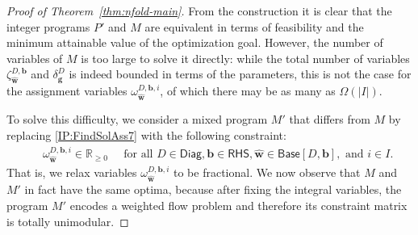 \documentclass{article}
\renewcommand{\geq}{\geqslant}
\newcommand{\R}{\mathbb{R}}
\newcommand{\myRn}{\R_{\geq 0}} %
\newcommand{\tup}[1]{{\mathbf{#1}}}
\newcommand{\ww}{\tup w}
\newcommand{\whww}{{\widehat{\ww}}}
\newcommand{\bb}{\tup b}
\renewcommand{\gg}{\tup g}
\newcommand{\RHS}{\mathsf{RHS}}
\newcommand{\Diag}{\mathsf{Diag}}
\newcommand{\Base}{\mathsf{Base}}
\begin{document}
\begin{proof}[Proof of Theorem~\ref{thm:nfold-main}]
From the construction it is clear that the integer programs $P'$ and $M$ are equivalent in terms of feasibility and the minimum attainable value of the optimization goal. However, the number of variables of $M$ is too large to solve it directly: while the total number of variables $\zeta^{D,\bb}_{\whww}$ and $\delta^D_\gg$ is indeed bounded in terms of the parameters, this is not the case for the assignment variables $\omega^{D,\bb,i}_{\whww}$, of which there may be as many as $\Omega(|I|)$.

To solve this difficulty, we consider a mixed program $M'$ that differs from $M$ by replacing \cref{IP:FindSolAss7} with the following constraint:
\begin{align}
    & \quad\ \ \omega^{D,\bb,i}_{\whww} \in \myRn \quad\ \,\textrm{for all }D\in \Diag, \bb\in \RHS, \whww\in \Base[D,\bb], \textrm{ and } i\in I. &
\tag{C7'} \label{IP:FindSolAss7p}
\end{align}
That is, we relax variables $\omega^{D,\bb,i}_{\whww}$ to be fractional. We now observe that $M$ and $M'$ in fact have the same optima, because after fixing the integral variables, the program $M'$ encodes a weighted flow problem and therefore its constraint matrix is totally unimodular.


\end{proof}
\end{document}
